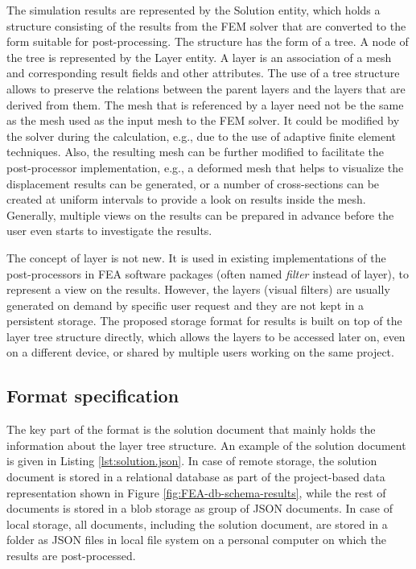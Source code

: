The simulation results are represented by the Solution entity, which holds a structure consisting of the results from the FEM solver that are converted to the form suitable for post-processing. The structure has the form of a tree. A node of the tree is represented by the Layer entity. A layer is an association of a mesh and corresponding result fields and other attributes. The use of a tree structure allows to preserve the relations between the parent layers and the layers that are derived from them. The mesh that is referenced by a layer need not be the same as the mesh used as the input mesh to the FEM solver. It could be modified by the solver during the calculation, e.g., due to the use of adaptive finite element techniques. Also, the resulting mesh can be further modified to facilitate the post-processor implementation, e.g., a deformed mesh that helps to visualize the displacement results can be generated, or a number of cross-sections can be created at uniform intervals to provide a look on results inside the mesh. Generally, multiple views on the results can be prepared in advance before the user even starts to investigate the results.

The concept of layer is not new. It is used in existing implementations of the post-processors in FEA software packages (often named \textit{filter} instead of layer), to represent a view on the results. However, the layers (visual filters) are usually generated on demand by specific user request and they are not kept in a persistent storage. The proposed storage format for results is built on top of the layer tree structure directly, which allows the layers to be accessed later on, even on a different device, or shared by multiple users working on the same project.


\subsection{Format specification}

The key part of the format is the solution document that mainly holds the information about the layer tree structure. An example of the solution document is given in Listing \ref{lst:solution.json}. In case of remote storage, the solution document is stored in a relational database as part of the project-based data representation shown in Figure \ref{fig:FEA-db-schema-results}, while the rest of documents is stored in a blob storage as group of JSON documents. In case of local storage, all documents, including the solution document, are stored in a folder as JSON files in local file system on a personal computer on which the results are post-processed.


